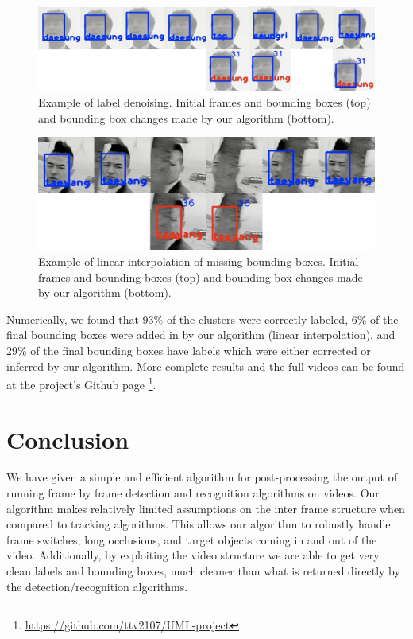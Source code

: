 \documentclass{article}
\begin{document}
\begin{figure}[!t]
\centering
\includegraphics[width=\linewidth]{labels.jpg}
\caption{Example of label denoising. Initial frames and bounding boxes (top) and bounding box changes made by our algorithm (bottom). }
\label{figure:labels}
\end{figure}

\begin{figure}[!t]
\centering
\includegraphics[width=\linewidth]{linear-interpolation.jpg}
\caption{Example of linear interpolation of missing bounding boxes. Initial frames and bounding boxes (top) and bounding box changes made by our algorithm (bottom). }
\label{figure:linear-interpolation}
\end{figure}

Numerically, we found that 93\% of the clusters were correctly labeled, 6\% of the final bounding boxes were added in by our algorithm (linear interpolation), and 29\% of the final bounding boxes have
labels which were either corrected or inferred by our algorithm. More complete results and the full videos can be found at the project's Github page \footnote{\url{https://github.com/ttv2107/UML-project}}.

\section{Conclusion}
We have given a simple and efficient algorithm for post-processing the output of running frame by frame detection and recognition algorithms on videos. Our algorithm makes
relatively limited assumptions on the inter frame structure when compared to tracking algorithms. This allows our algorithm to robustly handle frame switches, long occlusions, and
target objects coming in and out of the video. Additionally, by exploiting the video structure we are able to get very clean labels and bounding boxes, much cleaner than what is 
returned directly by the 
detection/recognition algorithms.
\end{document}
